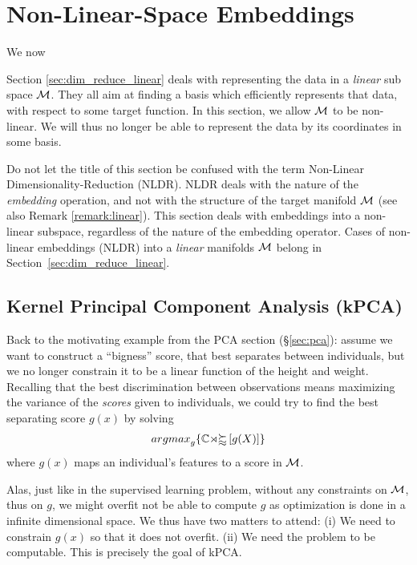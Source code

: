 \documentclass[12pt,a4paper]{article}
\begin{document}
\section{Non-Linear-Space Embeddings}
\label{sec:dim_reduce_nonlinear}

We now 



Section \ref{sec:dim_reduce_linear} deals with representing the data in a \emph{linear} sub space $\mathcal{M}$. They all aim at finding a basis which efficiently represents that data, with respect to some target function. 
In this section, we allow $\mathcal{M}$ to be non-linear. 
We will thus no longer be able to represent the data by its coordinates in some basis.


\begin{remark}
	\label{remark:nldr}
	Do not let the title of this section be confused with the term Non-Linear Dimensionality-Reduction (NLDR).
	NLDR deals with the nature of the \emph{embedding} operation, and not with the structure of the target manifold $\mathcal{M}$ (see also Remark \ref{remark:linear}).
	This section deals with embeddings into a non-linear subspace, regardless of the nature of the embedding operator.
	Cases of non-linear embeddings (NLDR) into a \emph{linear} manifolds $\mathcal{M}$ belong in Section~\ref{sec:dim_reduce_linear}.
\end{remark}




\subsection{Kernel Principal Component Analysis (kPCA)}
\label{sec:kpca}

Back to the motivating example from the PCA section (\S\ref{sec:pca}): assume we want to construct a ``bigness'' score, that best separates between individuals, but we no longer constrain it to be a linear function of the height and weight.
Recalling that the best discrimination between observations means maximizing the variance of the \emph{scores} given to individuals, we could try to find the best separating score $g(x)$ by solving 
\begin{align}
\label{eq:kpca_wrong}
\textstyle{\mathop{argmax}_{g}}\{ \mathbb{Cov} \left[ g(X) \right] \}
\end{align}
where $g(x)$ maps an individual's features to a score in $\mathcal{M}$.

Alas, just like in the supervised learning problem, without any constraints on $\mathcal{M}$, thus on $g$, we might overfit \andor not be able to compute $g$ as optimization is done in a infinite dimensional space. 
We thus have two matters to attend:
(i) We need to constrain $g(x)$ so that it does not overfit.
(ii) We need the problem to be computable.
This is precisely the goal of kPCA. 
\end{document}
